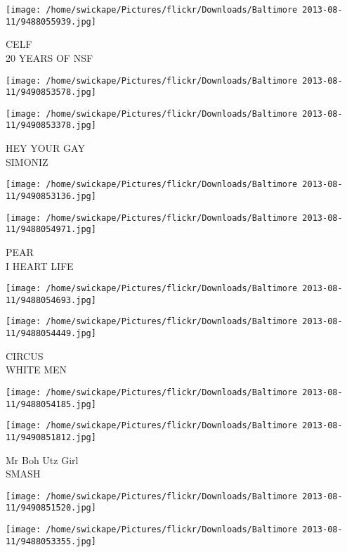 \documentclass[10pt,letterpaper]{article}
\begin{document}
\vspace{0.25in}
\texttt{[image: /home/swickape/Pictures/flickr/Downloads/Baltimore 2013-08-11/9488055939.jpg]}

CELF\\
20 YEARS OF NSF
\pagebreak

\texttt{[image: /home/swickape/Pictures/flickr/Downloads/Baltimore 2013-08-11/9490853578.jpg]}

\vspace{0.25in}
\texttt{[image: /home/swickape/Pictures/flickr/Downloads/Baltimore 2013-08-11/9490853378.jpg]}

HEY YOUR GAY\\
SIMONIZ
\pagebreak

\texttt{[image: /home/swickape/Pictures/flickr/Downloads/Baltimore 2013-08-11/9490853136.jpg]}

\vspace{0.25in}
\texttt{[image: /home/swickape/Pictures/flickr/Downloads/Baltimore 2013-08-11/9488054971.jpg]}

PEAR\\
I HEART LIFE
\pagebreak

\texttt{[image: /home/swickape/Pictures/flickr/Downloads/Baltimore 2013-08-11/9488054693.jpg]}

\vspace{0.25in}
\texttt{[image: /home/swickape/Pictures/flickr/Downloads/Baltimore 2013-08-11/9488054449.jpg]}

CIRCUS\\
WHITE MEN
\pagebreak

\texttt{[image: /home/swickape/Pictures/flickr/Downloads/Baltimore 2013-08-11/9488054185.jpg]}

\vspace{0.25in}
\texttt{[image: /home/swickape/Pictures/flickr/Downloads/Baltimore 2013-08-11/9490851812.jpg]}

Mr Boh Utz Girl\\
SMASH
\pagebreak

\texttt{[image: /home/swickape/Pictures/flickr/Downloads/Baltimore 2013-08-11/9490851520.jpg]}

\vspace{0.25in}
\texttt{[image: /home/swickape/Pictures/flickr/Downloads/Baltimore 2013-08-11/9488053355.jpg]}
\end{document}
